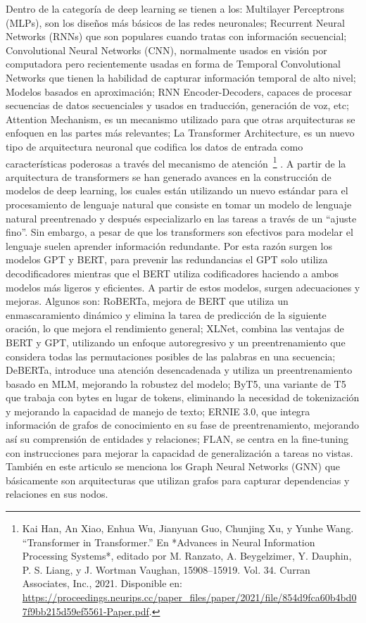 \documentclass[letterpaper,12pt]{article}
\begin{document}
Dentro de la categoría de deep learning se tienen a los: Multilayer Perceptrons (MLPs),
son los dise\~nos m\'as b\'asicos de las redes neuronales; Recurrent Neural Networks (RNNs)
que son populares cuando tratas con informaci\'on secuencial; Convolutional Neural Networks
(CNN), normalmente usados en visi\'on por computadora pero recientemente usadas en forma de
Temporal Convolutional Networks que tienen la habilidad de capturar información temporal 
de alto nivel; Modelos basados en aproximación; RNN Encoder-Decoders, capaces de procesar
secuencias de datos secuenciales y usados en traducci\'on, generaci\'on de voz, etc; 
Attention Mechanism, es un mecanismo utilizado para que otras arquitecturas se enfoquen en
las partes m\'as relevantes; La Transformer Architecture, es un nuevo tipo de arquitectura 
neuronal que codifica los datos de entrada como características poderosas a través 
del mecanismo de atención~\footnote{Kai Han, An Xiao, Enhua Wu, Jianyuan Guo, Chunjing 
Xu, y Yunhe Wang. ``Transformer in Transformer.'' En *Advances in Neural Information 
Processing Systems*, editado por M. Ranzato, A. Beygelzimer, Y. Dauphin, P. S. Liang, 
y J. Wortman Vaughan, 15908–15919. Vol. 34. Curran Associates, Inc., 2021. Disponible 
en: \url{https://proceedings.neurips.cc/paper_files/paper/2021/file/854d9fca60b4bd07f9bb215d59ef5561-Paper.pdf}.}
. A partir de la arquitectura de transformers se han generado avances en la construcci\'on de
modelos de deep learning, los cuales están utilizando un nuevo estándar para el procesamiento de
lenguaje natural que consiste en tomar un modelo de lenguaje natural preentrenado y después
especializarlo en las tareas a través de un ``ajuste fino''. Sin embargo, a pesar de que los 
transformers son efectivos para modelar el lenguaje suelen aprender información redundante. Por
esta raz\'on surgen los modelos GPT y BERT, para prevenir las redundancias el GPT solo utiliza 
decodificadores mientras que el BERT utiliza codificadores haciendo a ambos modelos 
m\'as ligeros y eficientes. A partir de estos modelos, surgen adecuaciones y 
mejoras. Algunos son:
RoBERTa, mejora de BERT que utiliza un enmascaramiento dinámico y elimina la 
tarea de predicción de la siguiente oración, lo que mejora el rendimiento
general; XLNet, combina las ventajas de BERT y GPT, utilizando un enfoque 
autoregresivo y un preentrenamiento que considera todas las permutaciones
posibles de las palabras en una secuencia;
DeBERTa, introduce una atención desencadenada y utiliza un preentrenamiento 
basado en MLM, mejorando la robustez del modelo; ByT5, una variante de T5 
que trabaja con bytes en lugar de tokens, eliminando la necesidad de 
tokenización y mejorando la capacidad de manejo de texto; ERNIE 3.0, que integra información de grafos de conocimiento 
en su fase de preentrenamiento, mejorando así su comprensión de entidades y 
relaciones; FLAN, se centra en la fine-tuning con instrucciones para mejorar la 
capacidad de generalización a tareas no vistas. También en este articulo se menciona
los Graph Neural Networks (GNN) que básicamente son arquitecturas que utilizan grafos 
para capturar dependencias y relaciones en sus nodos.
\end{document}

